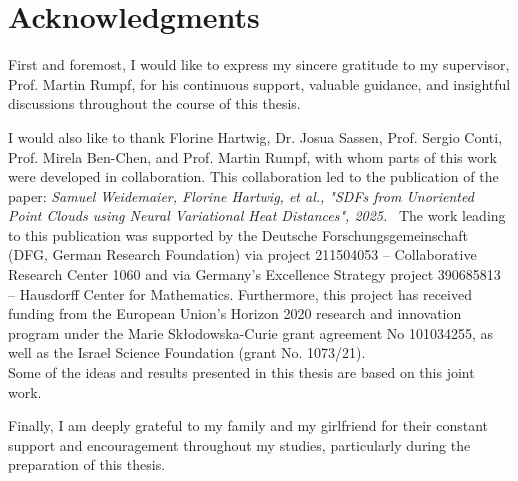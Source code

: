 \documentclass[12pt,openany]{book}
\theoremstyle{plainnormal}
\theoremstyle{remark}
\begin{document}
\section*{Acknowledgments}
\endgroup
First and foremost, I would like to express my sincere gratitude to my supervisor, Prof. Martin Rumpf, for his continuous support, valuable guidance, and insightful discussions throughout the course of this thesis.
\par
I would also like to thank Florine Hartwig, Dr. Josua Sassen, Prof. Sergio Conti, Prof. Mirela Ben-Chen, and Prof. Martin Rumpf, with whom parts of this work were developed in collaboration. This collaboration led to the publication of the paper:
\vspace{0.5em}
\noindent
\textit{Samuel Weidemaier, Florine Hartwig, et al., "SDFs from Unoriented Point Clouds using Neural Variational
Heat Distances", 2025.}
\,
\vspace{0.5em}
The work leading to this publication was supported by the Deutsche Forschungsgemeinschaft (DFG, German Research Foundation) via project 211504053 -- Collaborative Research Center 1060 and via Germany’s Excellence Strategy project 390685813 -- Hausdorff Center for Mathematics.
Furthermore, this project has received funding from the European Union’s Horizon 2020 research and innovation program under the Marie Skłodowska-Curie grant agreement No 101034255, as well as the Israel Science Foundation (grant No. 1073/21).\\
Some of the ideas and results presented in this thesis are based on this joint work.\par 
\noindent
Finally, I am deeply grateful to my family and my girlfriend for their constant support and encouragement throughout my studies, particularly during the preparation of this thesis.
\clearpage

\tableofcontents
\end{document}
